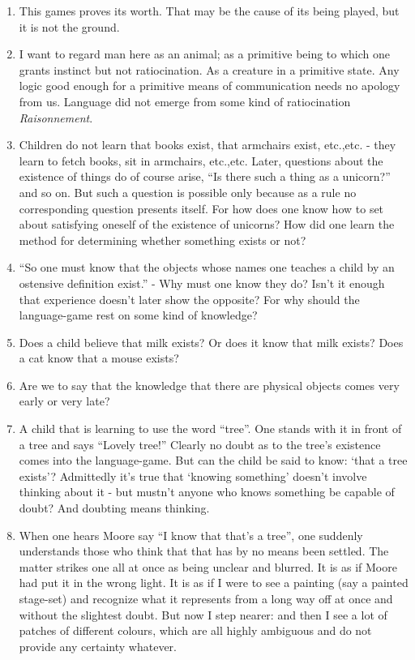 \documentclass{book}
\begin{document}
\begin{enumerate}
\item
This games proves its worth. That may be the cause of its being played, but it
is not the ground.

\item
I want to regard man here as an animal; as a primitive being to which one
grants instinct but not ratiocination. As a creature in a primitive state. Any
logic good enough for a primitive means of communication needs no apology from
us. Language did not emerge from some kind of ratiocination
\emph{Raisonnement}.

\item
Children do not learn that books exist, that armchairs exist, etc.,etc. - they
learn to fetch books, sit in armchairs, etc.,etc.  Later, questions about the
existence of things do of course arise, ``Is there such a thing as a unicorn?''
and so on. But such a question is possible only because as a rule no
corresponding question presents itself. For how does one know how to set about
satisfying oneself of the existence of unicorns? How did one learn the method
for determining whether something exists or not?

\item
``So one must know that the objects whose names one teaches a child by an
ostensive definition exist.'' - Why must one know they do? Isn't it enough that
experience doesn't later show the opposite?  For why should the language-game
rest on some kind of knowledge?

\item
Does a child believe that milk exists? Or does it know that milk exists? Does a
cat know that a mouse exists?

\item
Are we to say that the knowledge that there are physical objects comes very
early or very late?

\item
A child that is learning to use the word ``tree''. One stands with it in front
of a tree and says ``Lovely tree!'' Clearly no doubt as to the tree's existence
comes into the language-game. But can the child be said to know: `that a tree
exists'? Admittedly it's true that `knowing something' doesn't involve thinking
about it - but mustn't anyone who knows something be capable of doubt? And
doubting means thinking.

\item
When one hears Moore say ``I know that that's a tree'', one suddenly
understands those who think that that has by no means been settled.  The matter
strikes one all at once as being unclear and blurred. It is as if Moore had put
it in the wrong light.  It is as if I were to see a painting (say a painted
stage-set) and recognize what it represents from a long way off at once and
without the slightest doubt. But now I step nearer: and then I see a lot of
patches of different colours, which are all highly ambiguous and do not provide
any certainty whatever.


\end{enumerate}
\end{document}
